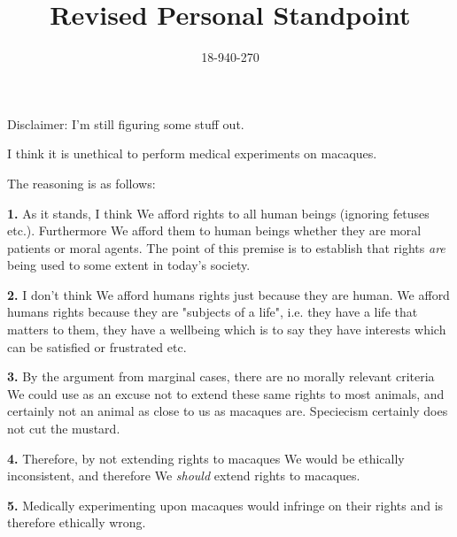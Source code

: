 \documentclass{article}
\begin{document}
\title{Revised Personal Standpoint}
\author{18-940-270}
\date{}

\maketitle
	Disclaimer: I'm still figuring some stuff out. 
	
	I think it is unethical to perform medical experiments on macaques.
	
	The reasoning is as follows: 
	
	\textbf{1.} As it stands, I think We afford rights to all human beings (ignoring fetuses etc.). Furthermore We afford them to human beings whether they are moral patients or moral agents. The point of this premise is to establish that rights \textit{are} being used to some extent in today's society.
	
	\textbf{2.} I don't think We afford humans rights just because  they are human. We afford humans rights because they are "subjects of a life", i.e. they have a life that matters to them, they have a wellbeing which is to say they have interests which can be satisfied or frustrated etc.
	
	\textbf{3.} By the argument from marginal cases, there are no morally relevant criteria We could use as an excuse not to extend these same rights to most animals, and certainly not an animal as close to us as macaques are. Speciecism certainly does not cut the mustard.
	
	\textbf{4.} Therefore, by not extending rights to macaques We would be ethically inconsistent, and therefore We \textit{should} extend rights to macaques.
	
	\textbf{5.} Medically experimenting upon macaques would infringe on their rights and is therefore ethically wrong.

	
\end{document}
